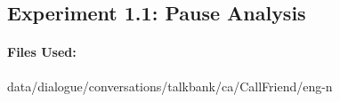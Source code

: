\subsection{Experiment 1.1: Pause Analysis}

\paragraph{Files Used:} {\small{data/dialogue/conversations/talkbank/ca/CallFriend/eng-n}}




